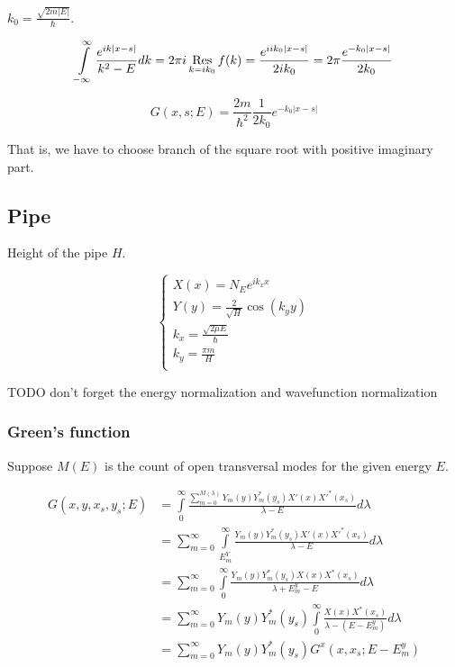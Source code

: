 \documentclass[12pt, a4paper]{article}
\def\res{\mathop{\operatorname{Res}}\limits}
\begin{document}
$k_0 = \frac{\sqrt{2m|E|}}{\hbar}$.


$$\int\limits_{-\infty}^\infty \frac{e^{ik|x -s|}}{k^2 - E} dk = 2 \pi i \res\limits_{k = i k_0} f(k) = \frac{e^{i i k_0 |x - s|}}{2 i k_0} = 2 \pi \frac{e^{-k_0 |x - s|}}{2 k_0}$$

$$G(x, s; E) = \frac{2m}{\hbar^2} \frac{1}{2 k_0} e^{-k_0 |x - s|}$$

That is, we have to choose branch of the square root with positive imaginary part.

\subsection{Pipe}

Height of the pipe $H$.

$$\begin{cases}
X(x) = N_E e^{i k_x x} \\
Y(y) = \frac{2}{\sqrt{H}} \cos(k_y y) \\
k_x = \frac{\sqrt{2 \mu E}}{\hbar} \\
k_y = \frac{\pi m}{H} \\
\end{cases}$$

TODO don't forget the energy normalization and wavefunction normalization

\subsubsection{Green's function}

Suppose $M(E)$ is the count of open transversal modes for the given energy $E$.

\begin{align*}
G(x, y, x_s, y_s; E)
&= \int\limits_{0}^{\infty} \frac{\sum\limits_{m = 0}^{M(\lambda)} Y_m(y) Y^*_m(y_s) X'(x) X'^*(x_s)  }{\lambda - E} d \lambda \\
&= \sum_{m = 0}^\infty \int\limits_{E^Y_m}^\infty \frac{Y_m(y) Y^*_m(y_s) X'(x) X'^*(x_s)}{\lambda - E} d\lambda \\
&= \sum_{m = 0}^\infty \int\limits_{0}^\infty \frac{Y_m(y) Y_m^*(y_s) X(x) X^*(x_s)}{\lambda + E^y_m - E} d\lambda \\
&= \sum_{m = 0}^\infty Y_m(y) Y^*_m(y_s) \int\limits_{0}^\infty \frac{X(x) X^*(x_s)}{\lambda - (E - E^y_m)} d\lambda \\
&= \sum_{m = 0}^\infty Y_m(y) Y^*_m(y_s) G^x(x, x_s; E - E^y_m) \\
\end{align*}
\end{document}

